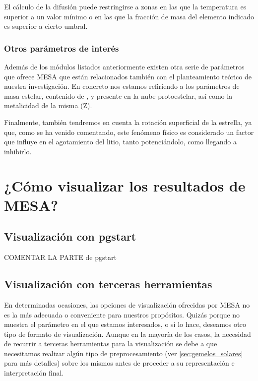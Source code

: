 El cálculo de la difusión puede restringirse a zonas en las que la temperatura es superior a un valor mínimo o en las que la fracción de masa del elemento indicado es superior a cierto umbral.\par

\subsubsection{Otros parámetros de interés}
Además de los módulos listados anteriormente existen otra serie de parámetros que ofrece MESA que están relacionados también con el planteamiento teórico de nuestra investigación. En concreto nos estamos refiriendo a los parámetros de masa estelar, contenido de ,  y  presente en la nube protoestelar, así como la metalicidad de la misma (Z).\par

Finalmente, también tendremos en cuenta la rotación superficial de la estrella, ya que, como se ha venido comentando, este fenómeno físico es considerado un factor que influye en el agotamiento del litio, tanto potenciándolo, como llegando a inhibirlo.\par

\section{¿Cómo visualizar los resultados de MESA?}
\subsection{Visualización con pgstart}
COMENTAR LA PARTE de pgstart


\subsection{Visualización con terceras herramientas}
En determinadas ocasiones, las opciones de visualización ofrecidas por MESA no es la más adecuada o conveniente para nuestros propósitos. Quizás porque no muestra el parámetro en el que estamos interesados, o si lo hace, deseamos otro tipo de formato de visualización. Aunque en la mayoría de los casos, la necesidad de recurrir a terceras herramientas para la visualización se debe a que necesitamos realizar algún tipo de preprocesamiento (ver \ref{sec:gemelos_solares} para más detalles) sobre los mismos antes de proceder a su representación e interpretación final.\par

